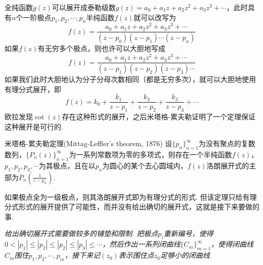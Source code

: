 \documentclass[main.tex]{subfiles}
\begin{document}
全纯函数\(g(z)\)可以展开成泰勒级数\(g(z)=a_0+a_1z+a_2z^2+a_3z^3+\cdots\)，此时具有\(n\)个一阶极点\(p_1, p_2, \cdots, p_n\)半纯函数\(f(z)\)就可以改写为
\[f(z)=\frac{a_0+a_1z+a_2z^2+a_3z^3+\cdots}{(z-p_0)(z-p_1)\cdots(z-p_n)}\]
如果\(f(z)\)有无穷多个极点，则也许可以大胆地写成
\[f(z)=\frac{a_0+a_1z+a_2z^2+a_3z^3+\cdots}{(z-p_1)(z-p_2)(z-p_3)\cdots}\]
如果我们此时大胆地认为分子分母次数相同（都是无穷多次），就可以大胆地使用有理分式展开，即
\[f(z)=k_0+\frac{k_1}{z-p_1}+\frac{k_2}{z-p_2}+\frac{k_3}{z-p_3}+\cdots\]
欧拉发现\(\cot(z)\)存在这种形式的展开，之后米塔格-累夫勒证明了一个定理保证这种展开是可行的.

\begin{theorem}{米塔格-累夫勒定理(Mittag-Leffler's theorem, 1876)}
    设\(\{p_n\}_{n=1}^{\infty}\)为没有聚点的复数数列，\(\{P_n(z)\}_{n=1}^{\infty}\)为一系列常数项为零的多项式，则存在一个半纯函数\(f(z)\)，\(p_1,p_2,p_3,\cdots\)为其极点，且在以\(p_n\)为圆心的某个去心圆域内，\(f(z)\)洛朗展开式的主部为\(\displaystyle{P_n\left(\frac{1}{z-p_n}\right)}\).
\end{theorem}

如果极点全为一级极点，则其洛朗展开式即为有理分式的形式. 但该定理只给有理分式形式的展开提供了可能性，而并没有给出确切的展开式，这就是接下来要做的事.

\vspace{1cm}

\textit{
给出确切展开式需要做较多的铺垫和限制. 把极点\(p_i\)重新编号，使得\(0<|p_1|\leq|p_2|\leq|p_2|\leq|p_3|\leq \cdots\)，然后作出一系列闭曲线\(\{C_m\}_{m=1}^{\infty}\)，使得闭曲线\(C_m\)围住\(p_1, p_2, \cdots, p_m\)，接下来记\((z_0)\)表示围住点\(z_0\)足够小的闭曲线.
}
\end{document}
